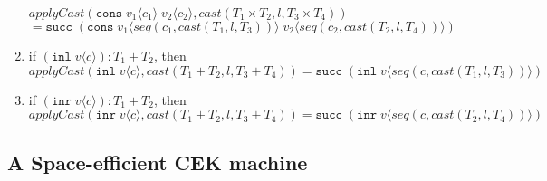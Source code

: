 \documentclass[acmsmall,review,anonymous]{acmart}\settopmatter{printfolios=true,printccs=false,printacmref=false}
\newcommand{\plus}[0]{+}
\newcommand{\POOprod}[2]{#1 \times #2}
\newcommand{\POOsum}[2]{#1 \plus #2}
\newcommand{\rOOsucc}[1]{\mathtt{succ}\;#1}
\newcommand{\hcvOOcons}[4]{\mathtt{cons}\;#1\langle#2\rangle\;#3\langle#4\rangle}
\newcommand{\hcvOOinl}[2]{\mathtt{inl}\;#1\langle#2\rangle}
\newcommand{\hcvOOinr}[2]{\mathtt{inr}\;#1\langle#2\rangle}
\newcommand{\ineffCEKD}{$\mathcal{D}$}
\begin{document}
\begin{definition}
\begin{enumerate}
    $ 
    applyCast(\hcvOOcons{v_1}{c_1}{v_2}{c_2},cast(\POOprod{T_1}{T_2},l,T_3 
    \times 
    T_4))$\\
    $ = 
    \rOOsucc{(\hcvOOcons{v_1}{seq(c_1,cast(T_1,l,T_3))}{v_2}{seq(c_2,cast(T_2,l,T_4))})}
    $ 
  \item if $(\hcvOOinl{v}{c}) : \POOsum{T_1}{T_2}$,
    then \\
    $ 
    applyCast(\hcvOOinl{v}{c},cast(\POOsum{T_1}{T_2},l,\POOsum{T_3}{T_4}))
    = \rOOsucc{(\hcvOOinl{v}{seq(c,cast(T_1,l,T_3))})} $
  \item if $(\hcvOOinr{v}{c}) : \POOsum{T_1}{T_2}$,
    then \\$
    applyCast(\hcvOOinr{v}{c},cast(\POOsum{T_1}{T_2},l,\POOsum{T_3}{T_4}))
    = \rOOsucc{(\hcvOOinr{v}{seq(c,cast(T_2,l,T_4))})} $
  \end{enumerate}
\end{definition}


\subsection{A Space-efficient CEK machine}
\label{sec:framework:cek}
\end{document}
